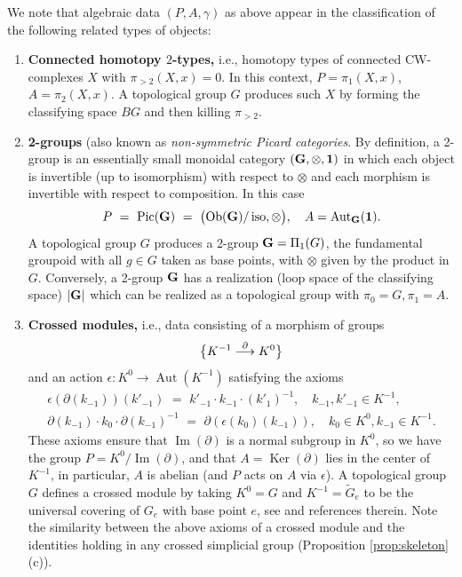 \documentclass[english,11pt,leqno]{article}
\def\Aut{\operatorname{Aut}\nolimits}
\def\Ker{\operatorname{Ker}\nolimits}
\def\Ob{\operatorname{Ob}\nolimits}
\def\on{\operatorname}
\def\lra{\longrightarrow}
\theoremstyle{definition}
\theoremstyle{remark}
\numberwithin{equation}{section}
\begin{document}
We note that algebraic data $(P,A,\gamma)$ as above appear in the classification of the following related
types of objects:
\begin{enumerate}
	\item {\bf Connected homotopy $2$-types,} i.e., homotopy types of connected CW-complexes $X$
with $\pi_{> 2}(X,x)=0$. In this context, $P=\pi_1(X,x)$, $A=\pi_2(X,x)$. 
A topological group $G$ produces such $X$ by forming the classifying space $BG$ and then 
killing $\pi_{> 2}$. 

\item {\bf 2-groups} (also known as {\em non-symmetric Picard categories}. By definition, a 2-group
is an essentially small monoidal category $({\bf G}, \otimes, {\bf 1})$ in which each object is invertible
(up to isomorphism) with respect to $\otimes$ and each morphism is invertible with respect to composition.
In this case
\[
P\,\,=\,\,\on{Pic}({\bf G}) \,\,=\,\, \bigl( \Ob({\bf G})/\on{iso}, \otimes\bigr), \quad A=\Aut_{\bf G}({\bf 1}). 
\]
A topological group $G$ produces a 2-group ${\bf G}=\Pi_1(G)$, the fundamental groupoid
with all $g\in G$ taken as base points, with $\otimes$ given by the product in $G$.
Conversely, a 2-group $\bf G$ has a realization (loop space of the classifying space) $|{\bf G}|$
which can be realized as a topological group with $\pi_0=G, \pi_1=A$. 


\item {\bf Crossed modules,}
i.e.,  data consisting of a morphism of groups
\[
\bigl\{ K^{-1} \buildrel\partial \over\lra K^0\bigr\}
\]
and an action $\epsilon: K^0\to \Aut(K^{-1})$ satisfying the axioms
\[
\begin{gathered}
\epsilon(\partial(k_{-1}))(k'_{-1}) \,\,=\,\, k'_{-1} \cdot k_{-1} \cdot (k'_1)^{-1},\quad k_{-1}, k'_{-1} \in K^{-1},
\\
\partial(k_{-1})\cdot k_0 \cdot \partial(k_{-1})^{-1} \,\,=\,\, \partial (\epsilon(k_0)(k_{-1})),
\quad
k_0\in K^0, k_{-1}\in K^{-1}.
\end{gathered}
\]
These axioms ensure that $\on{Im}(\partial)$ is a normal subgroup in $K^0$, so we have the
group $P=K^0/\on{Im}(\partial)$, and that $A=\Ker(\partial)$ lies in the center of $K^{-1}$,
in particular, $A$ is abelian (and $P$ acts on $A$ via $\epsilon$). 
A topological group $G$ defines a crossed module by taking $K^0=G$ and $K^{-1}=\widetilde{G}_e$
to be the universal covering of $G_e$ with base point $e$, see \cite{brown-mucuk} and references therein.
Note the similarity between the above axioms of a crossed module and the identities holding in
any crossed simplicial group (Proposition \ref{prop:skeleton}(c)). 
\end{enumerate}
\end{document}
